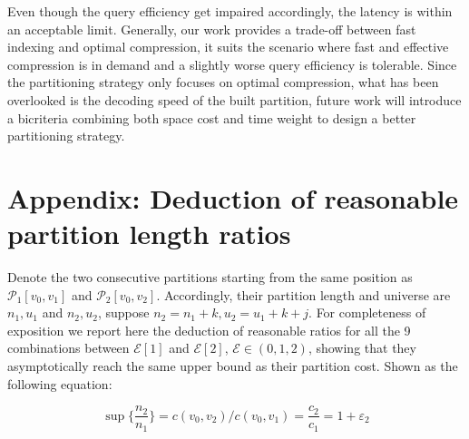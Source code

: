 \documentclass[runningheads]{comsis2}
\begin{document}
Even though the query efficiency get impaired accordingly, the latency is within an acceptable limit.
Generally, our work provides a trade-off between fast indexing and optimal compression, it suits the scenario where fast and effective compression is in demand and a slightly worse query efficiency is tolerable.
Since the partitioning strategy only focuses on optimal compression, what has been overlooked is the decoding speed of the built partition, future work will introduce a bicriteria combining both space cost and time weight to design a better partitioning strategy.




\section*{Appendix: Deduction of reasonable partition length ratios}\label{sec:appendix}

Denote the two consecutive partitions starting from the same position as $ \mathcal{P}_{1}[ v_0, v_1 ] $ and $ \mathcal{P}_{2}[v_0, v_2] $.
Accordingly, their partition length and universe are $ n_1, u_1 $ and $ n_2, u_2 $, suppose $n_2 = n_1 + k, u_2 = u_1 + k + j $.
For completeness of exposition we report here the deduction of reasonable ratios for all the 9 combinations between $ \mathcal{E}[1] $ and $ \mathcal{E}[2] $, $ \mathcal{E} \in (0, 1, 2) $, showing that they asymptotically reach the same upper bound as their partition cost.
Shown as the following equation:

\begin{equation}
\sup\{\frac{n_2}{n_{1}}\} = {c\left(v_{0}, v_{2}\right)}/{c\left(v_{0}, v_{1}\right)}=\frac{c_2}{c_1}=1+\varepsilon_{2}
\end{equation}
\end{document}
